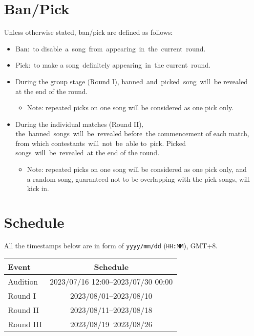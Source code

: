 \documentclass{article}
\newcommand{\alert}[1]{{\color{red} #1}}
\begin{document}
\section{Ban/Pick}

Unless otherwise stated, ban/pick are defined as follows:

\begin{itemize}
	\item Ban: to disable a song from appearing in the current round.

	\item Pick: to make a song definitely appearing in the current round.

	\item During the group stage (Round I),
	      banned and picked song will be revealed
	      at the end of the round.
	      \begin{itemize}
		      \item \alert{
			            Note: repeated picks on one
			            song will be considered as one pick only.
		            }
	      \end{itemize}

	\item During the individual matches (Round II),
	      the banned songs will be revealed before the commencement of each match,
	      from which contestants will not be able to pick.
	      Picked songs will be revealed at the end of the round.
	      \begin{itemize}
		      \item \alert{
			            Note: repeated picks on one
			            song will be considered as one pick only,
			            and a random song,
			            guaranteed not to be
			            overlapping with the pick songs,
			            will kick in.  %
		            }
	      \end{itemize}
\end{itemize}

\section{Schedule}

All the timestamps below are in form of
\texttt{yyyy/mm/dd} (\texttt{HH:MM}), GMT+8.

\begin{table}[!ht]
	\centering
	\begin{tabular}{lc}
		\hline
		Event     & Schedule                           \\ \hline
		Audition  & 2023/07/16 12:00--2023/07/30 00:00 \\
		Round I   & 2023/08/01--2023/08/10             \\
		Round II  & 2023/08/11--2023/08/18             \\
		Round III & 2023/08/19--2023/08/26             \\ \hline
	\end{tabular}
\end{table}
\end{document}
